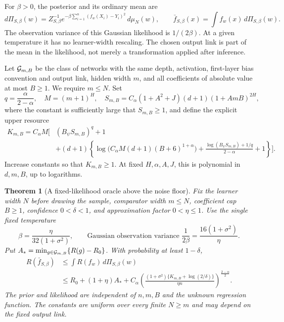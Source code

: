 \documentclass[11pt]{article}
\newtheorem{theorem}{Theorem}[section]\newtheorem{lemma}[theorem]{Lemma}
\theoremstyle{remark}\newtheorem{remark}[theorem]{Remark}
\begin{document}
For $\beta>0$, the posterior and its ordinary mean are
\begin{equation}
 d\Pi_{S,\beta}(w)=Z_{S,\beta}^{-1}
 e^{-\beta\sum_{i=1}^n(f_w(X_i)-Y_i)^2}\,d\mu_N(w),
 \qquad \bar f_{S,\beta}(x)=\int f_w(x)\,d\Pi_{S,\beta}(w).
 \label{eq:posterior}
\end{equation}
The observation variance of this Gaussian likelihood is $1/(2\beta)$. At a given temperature it has no learner-width rescaling. The chosen output link is part of the mean in the likelihood, not merely a transformation applied after inference.

Let $\mathcal G_{m,B}$ be the class of networks with the same depth, activation, first-layer bias convention and output link, hidden width $m$, and all coefficients of absolute value at most $B\ge1$. We require $m\le N$. Set
\begin{equation}
 q=\frac\alpha{2-\alpha},\quad M=(m+1)^H,\quad
 S_{m,B}=C_\alpha(1+A^2+J)(d+1)(1+AmB)^{2H},
 \label{eq:resources}
\end{equation}
where the constant is sufficiently large that $S_{m,B}\ge1$, and define the explicit upper resource
\begin{align}
 K_{m,B}=C_\alpha M\bigg[&(B_\psi S_{m,B})^q+1\\[-2mm]
 &+(d+1)\left\{\log\!\big(C_\alpha M(d+1)(B+6)^{1+\alpha}\big)
 +\frac{\log(B_\psi S_{m,B})+1/q}{2-\alpha}+1\right\}\bigg].
 \label{eq:complexity}
\end{align}
Increase constants so that $K_{m,B}\ge1$. At fixed $H,\alpha,A,J$, this is polynomial in $d,m,B$, up to logarithms.

\begin{theorem}[A fixed-likelihood oracle above the noise floor]\label{thm:fast-oracle}
Fix the learner width $N$ before drawing the sample, comparator width $m\le N$, coefficient cap $B\ge1$, confidence $0<\delta<1$, and approximation factor $0<\eta\le1$. Use the single fixed temperature
\[
 \beta=\frac{\eta}{32(1+\sigma^2)},
 \qquad \text{Gaussian observation variance }\frac1{2\beta}
                   =\frac{16(1+\sigma^2)}\eta.
\]
Put $A_* =\min_{g\in\mathcal G_{m,B}}\{R(g)-R_0\}$. With probability at least $1-\delta$,
\begin{align}
 R(\bar f_{S,\beta})
 &\le\int R(f_w)\,d\Pi_{S,\beta}(w)\\
 &\le R_0+(1+\eta)A_*
 +C_\alpha\left(
 \frac{(1+\sigma^2)\{K_{m,B}+\log(2/\delta)\}}{\eta n}
 \right)^{\frac{2-\alpha}{2}}.
 \label{eq:fast-oracle}
\end{align}
The prior and likelihood are independent of $n,m,B$ and the unknown regression function. The constants are uniform over every finite $N\ge m$ and may depend on the fixed output link.
\end{theorem}
\end{document}
